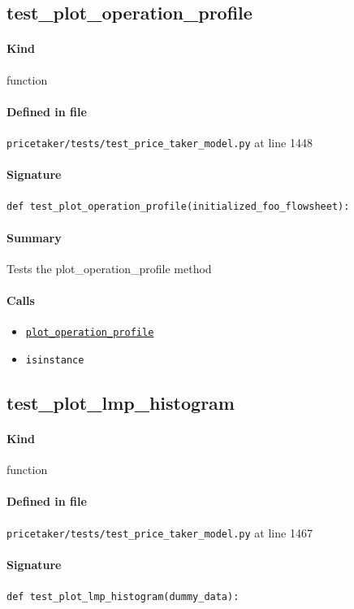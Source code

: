 \documentclass[11pt]{report}
\begin{document}
\subsection{test\_plot\_operation\_profile}
\label{def:pricetaker-tests-test_price_taker_model.py:test_plot_operation_profile:L1448}
\paragraph{Kind} function
\paragraph{Defined in file} \texttt{pricetaker/tests/test\_price\_taker\_model.py} at line 1448
\paragraph{Signature} \texttt{def test\_plot\_operation\_profile(initialized\_foo\_flowsheet):}
\paragraph{Summary} Tests the plot\_operation\_profile method
\paragraph{Calls}
\begin{itemize}[leftmargin=*]
  \item \hyperref[def:pricetaker-price_taker_model.py:PriceTakerModel.plot_operation_profile:L1281]{\texttt{plot\_operation\_profile}}
  \item \texttt{isinstance}
\end{itemize}
\subsection{test\_plot\_lmp\_histogram}
\label{def:pricetaker-tests-test_price_taker_model.py:test_plot_lmp_histogram:L1467}
\paragraph{Kind} function
\paragraph{Defined in file} \texttt{pricetaker/tests/test\_price\_taker\_model.py} at line 1467
\paragraph{Signature} \texttt{def test\_plot\_lmp\_histogram(dummy\_data):}
\end{document}
